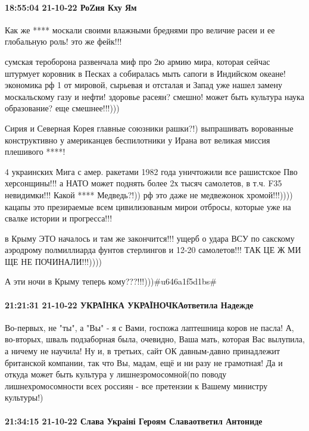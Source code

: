 \paragraph{18:55:04 21-10-22 РоZия Кху Ям}

Как же **** москали своими влажными бреднями про величие расеи и ее глобальную
роль! это же фейк!!!

сумская тероборона развенчала миф про 2ю армию мира, которая сейчас штурмует
коровник в Песках а собиралась мыть сапоги в Индийском океане! экономика рф 1%
от мировой, сырьевая и отсталая и Запад уже нашел замену москальскому газу и
нефти! здоровье расеян? смешно! может быть культура наука образование? еще
смешнее!!!)))

Сирия и Северная Корея главные союзники рашки?!) выпрашивать ворованные
конструктивно у американцев беспилотники у Ирана вот великая миссия плешивого
****!

4 украинских Мига с амер. ракетами 1982 года уничтожили все рашистское Пво
херсонщины!!! а НАТО может поднять более 2х тысяч самолетов, в т.ч. F35
невидимки!!! Какой **** Медведь?!)) рф это даже не медвежонок хромой!!!))))
кацапы это презираемые всем цивилизованым мирои отбросы, которые уже на свалке
истории и прогресса!!!

в Крыму ЭТО началось и там же закончится!!! ущерб о удара ВСУ по сакскому
аэродрому полмиллиарда фунтов стерлингов и 12-20 самолетов!!! ТАК ЦЕ Ж МИ ЩЕ НЕ
ПОЧИНАЛИ!!!))))

А эти ночи в Крыму теперь кому???!!!)))#u646a1f5d1bs#

\paragraph{21:21:31 21-10-22 УКРАЇНКА УКРАЇНОЧКАответила Надежде}

Во-первых, не "ты", а "Вы" - я с Вами, госпожа лаптешница коров не пасла! А,
во-вторых, шваль подзаборная была, очевидно, Ваша мать, которая Вас вылупила, а
ничему не научила! Ну и, в третьих, сайт ОК давным-давно принадлежит британской
компании, так что Вы, мадам, ещё и ни разу не грамотная! Да и откуда может быть
культура у лишнезромосомной(по поводу лишнехромосомности всех россиян - все
претензии к Вашему министру культуры!)

\paragraph{21:34:15 21-10-22 Слава Украіні Героям Славаответил Антониде}

